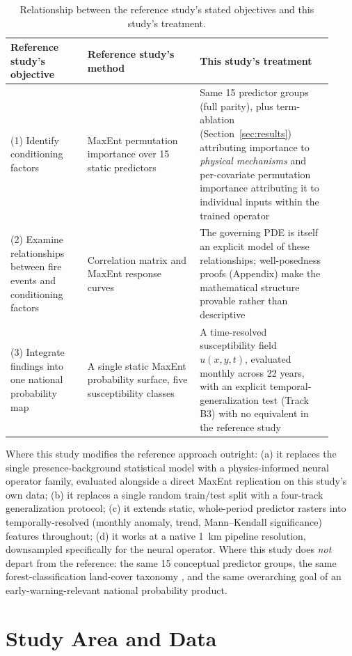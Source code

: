 \documentclass[journal]{IEEEtran}
\begin{document}
\begin{table}[t]
\centering
\caption{Relationship between the reference study's stated objectives and this study's treatment.}
\label{tab:objectives}
\begin{tabular}{p{0.22\linewidth}p{0.32\linewidth}p{0.38\linewidth}}
\toprule
\textbf{Reference study's objective} & \textbf{Reference study's method} & \textbf{This study's treatment} \\
\midrule
(1) Identify conditioning factors & MaxEnt permutation importance over 15 static predictors & Same 15 predictor groups (full parity), plus term-ablation (Section~\ref{sec:results}) attributing importance to \emph{physical mechanisms} and per-covariate permutation importance attributing it to individual inputs within the trained operator \\
(2) Examine relationships between fire events and conditioning factors & Correlation matrix and MaxEnt response curves & The governing PDE is itself an explicit model of these relationships; well-posedness proofs (Appendix) make the mathematical structure provable rather than descriptive \\
(3) Integrate findings into one national probability map & A single static MaxEnt probability surface, five susceptibility classes & A time-resolved susceptibility field $u(x,y,t)$, evaluated monthly across 22 years, with an explicit temporal-generalization test (Track B3) with no equivalent in the reference study \\
\bottomrule
\end{tabular}
\end{table}

Where this study modifies the reference approach outright: (a) it replaces the single presence-background statistical model with a physics-informed neural operator family, evaluated alongside a direct MaxEnt replication on this study's own data; (b) it replaces a single random train/test split with a four-track generalization protocol; (c) it extends static, whole-period predictor rasters into temporally-resolved (monthly anomaly, trend, Mann--Kendall significance) features throughout; (d) it works at a native 1~km pipeline resolution, downsampled specifically for the neural operator. Where this study does \emph{not} depart from the reference: the same 15 conceptual predictor groups, the same forest-classification land-cover taxonomy \cite{sannigrahi2018}, and the same overarching goal of an early-warning-relevant national probability product.


\section{Study Area and Data}
\label{sec:data}
\end{document}
